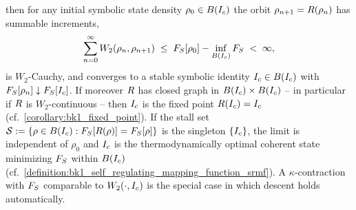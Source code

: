 \begin{theorem}
\begin{itemize}
\end{itemize}
then for any initial symbolic state density $\rho_0 \in B(I_c)$ the orbit $\rho_{n+1} = R(\rho_n)$ has summable increments,
\[
\sum_{n=0}^{\infty}W_2(\rho_n,\rho_{n+1}) \;\le\; F_S[\rho_0] - \inf_{B(I_c)}F_S \;<\; \infty,
\]
is $W_2$-Cauchy, and converges to a stable symbolic identity $I_c \in B(I_c)$ with $F_S[\rho_n] \downarrow F_S[I_c]$. If moreover $R$ has closed graph in $B(I_c)\times B(I_c)$ -- in particular if $R$ is $W_2$-continuous -- then $I_c$ is the fixed point $R(I_c) = I_c$ (cf.~\ref{corollary:bk1_fixed_point}). If the stall set $\mathcal{S} := \{\rho \in B(I_c) : F_S[R(\rho)] = F_S[\rho]\}$ is the singleton $\{I_c\}$, the limit is independent of $\rho_0$ and $I_c$ is the thermodynamically optimal coherent state minimizing $F_S$ within $B(I_c)$ (cf.~\ref{definition:bk1_self_regulating_mapping_function_srmf}). A $\kappa$-contraction with $F_S$ comparable to $W_2(\cdot,I_c)$ is the special case in which descent holds automatically.
\end{theorem}

